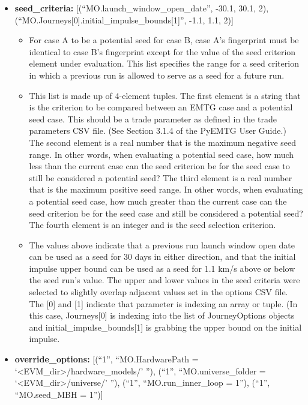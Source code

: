 \documentclass[11pt]{article}
\begin{document}
\begin{itemize}
\begin{itemize}
	\end{itemize}
	\item\textbf{seed\_criteria:} [(``MO.launch\_window\_open\_date'', -30.1, 30.1, 2),\newline (``MO.Journeys[0].initial\_impulse\_bounds[1]'', -1.1, 1.1, 2)]
	\begin{itemize}
		\item For case A to be a potential seed for case B, case A’s fingerprint must be identical to case B’s fingerprint except for the value of the seed criterion element under evaluation. This list specifies the range for a seed criterion in which a previous run is allowed to serve as a seed for a future run.
		\item This list is made up of 4-element tuples. The first element is a string that is the criterion to be compared between an \ac{EMTG} case and a potential seed case. This should be a trade parameter as defined in the trade parameters CSV file. (See Section 3.1.4 of the PyEMTG User Guide.) The second element is a real number that is the maximum negative seed range. In other words, when evaluating a potential seed case, how much less than the current case can the seed criterion be for the seed case to still be considered a potential seed? The third element is a real number that is the maximum positive seed range. In other words, when evaluating a potential seed case, how much greater than the current case can the seed criterion be for the seed case and still be considered a potential seed? The fourth element is an integer and is the seed selection criterion.
		\item The values above indicate that a previous run launch window open date can be used as a seed for 30 days in either direction, and that the initial impulse upper bound can be used as a seed for 1.1 km/s above or below the seed run’s value. The upper and lower values in the seed criteria were selected to slightly overlap adjacent values set in the options CSV file. The [0] and [1] indicate that parameter is indexing an array or tuple. (In this case, Journeys[0] is indexing into the list of JourneyOptions objects and initial\_impulse\_bounds[1] is grabbing the upper bound on the initial impulse.
	\end{itemize}
	\item\textbf{override\_options:} [(``1'', ``MO.HardwarePath = `\textless EVM\_dir\textgreater /hardware\_models/' ''), (``1'', ``MO.universe\_folder = `\textless EVM\_dir\textgreater /universe/' ''), (``1'', ``MO.run\_inner\_loop = 1''), (``1'', ``MO.seed\_MBH = 1'')]

\end{itemize}
\end{document}
